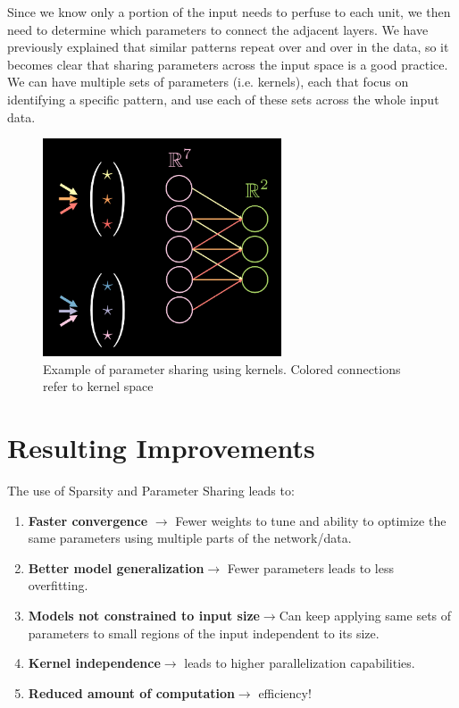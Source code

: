 \begin{enumerate}
              Since we know only a portion of the input needs to perfuse to each unit, we then need to determine which parameters to connect the adjacent layers. 
              We have previously explained that similar patterns repeat over and over in the data, so it becomes clear that sharing parameters across the input space is a good practice. 
              We can have multiple sets of parameters (i.e. kernels), each that focus on identifying a specific pattern, and use each of these sets across the whole input data. 
              
            \begin{figure}[H]
            \begin{center}
            \includegraphics[width=200pt]{figs/kernel.png}
            \end{center}
            \captionsetup{justification=centering, margin=2cm}
            \caption{Example of parameter sharing using kernels. Colored connections refer to kernel space}
            \end{figure}
            
    \end{enumerate}
    
    \section{Resulting Improvements}    
    The use of Sparsity and Parameter Sharing leads to:
    \begin{enumerate}
        \item \textbf{Faster convergence} \(\rightarrow\) Fewer weights to tune and ability to optimize the same parameters using multiple parts of the network/data.
        \item \textbf{Better model generalization}\(\rightarrow\) Fewer parameters leads to less overfitting.
        \item \textbf{Models not constrained to input size}\(\rightarrow\)Can keep applying same sets of parameters to small regions of the input independent to its size.
        \item \textbf{Kernel independence}\(\rightarrow\) leads to higher parallelization capabilities.
        \item \textbf{Reduced amount of computation}\(\rightarrow\) efficiency! 
    \end{enumerate}
    
